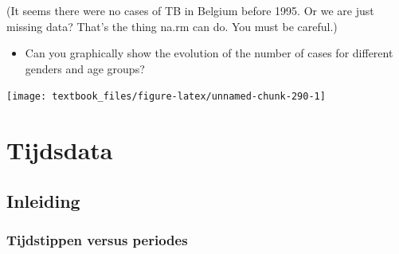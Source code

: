 \documentclass[]{tufte-book}
\newenvironment{Shaded}{}{}
\newcommand{\DataTypeTok}[1]{\textcolor[rgb]{0.56,0.13,0.00}{#1}}
\newcommand{\DecValTok}[1]{\textcolor[rgb]{0.25,0.63,0.44}{#1}}
\newcommand{\KeywordTok}[1]{\textcolor[rgb]{0.00,0.44,0.13}{\textbf{#1}}}
\newcommand{\NormalTok}[1]{#1}
\newcommand{\OperatorTok}[1]{\textcolor[rgb]{0.40,0.40,0.40}{#1}}
\newcommand{\StringTok}[1]{\textcolor[rgb]{0.25,0.44,0.63}{#1}}
\providecommand{\tightlist}{%
  \setlength{\itemsep}{0pt}\setlength{\parskip}{0pt}}
\begin{document}
(It seems there were no cases of TB in Belgium before 1995. Or we are just missing data? That's the thing na.rm can do. You must be careful.)

\begin{itemize}
\tightlist
\item
  Can you graphically show the evolution of the number of cases for different genders and age groups?
\end{itemize}

\begin{Shaded}
\end{Shaded}

\texttt{[image: textbook\_files/figure-latex/unnamed-chunk-290-1]}

\hypertarget{tijdsdata}{%
\chapter{Tijdsdata}\label{tijdsdata}}

\hypertarget{inleiding-1}{%
\section{Inleiding}\label{inleiding-1}}

\hypertarget{tijdstippen-versus-periodes}{%
\subsection{Tijdstippen versus periodes}\label{tijdstippen-versus-periodes}}
\end{document}
